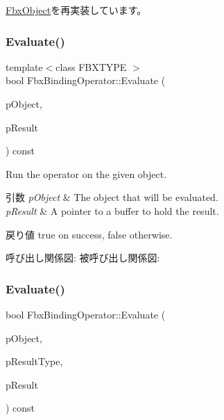 \hyperlink{class_fbx_object_a123e084d9b32b29c28af6384b7c3c608}{Fbx\+Object}を再実装しています。

\mbox{\label{class_fbx_binding_operator_a1487485be07b04ef755f8831912d2709}} 
\subsubsection{\texorpdfstring{Evaluate()}{Evaluate()}\hspace{0.1cm}{\footnotesize\ttfamily [1/2]}}
{\footnotesize\ttfamily template$<$class F\+B\+X\+T\+Y\+PE $>$ \\
bool Fbx\+Binding\+Operator\+::\+Evaluate (\begin{DoxyParamCaption}\item[{const \hyperlink{class_fbx_object}{Fbx\+Object} $\ast$}]{p\+Object,  }\item[{F\+B\+X\+T\+Y\+PE $\ast$}]{p\+Result }\end{DoxyParamCaption}) const}

Run the operator on the given object. 
\begin{DoxyParams}{引数}
{\em p\+Object} & The object that will be evaluated. \\
\hline
{\em p\+Result} & A pointer to a buffer to hold the result. \\
\hline
\end{DoxyParams}
\begin{DoxyReturn}{戻り値}
{\ttfamily true} on success, {\ttfamily false} otherwise. 
\end{DoxyReturn}
呼び出し関係図\+:
被呼び出し関係図\+:
\mbox{\label{class_fbx_binding_operator_a46e67c6d662013ae83cd239648d85630}} 
\subsubsection{\texorpdfstring{Evaluate()}{Evaluate()}\hspace{0.1cm}{\footnotesize\ttfamily [2/2]}}
{\footnotesize\ttfamily bool Fbx\+Binding\+Operator\+::\+Evaluate (\begin{DoxyParamCaption}\item[{const \hyperlink{class_fbx_object}{Fbx\+Object} $\ast$}]{p\+Object,  }\item[{\hyperlink{fbxpropertytypes_8h_a73913a5ddfb20e57c6f25e9e6784bd92}{E\+Fbx\+Type} $\ast$}]{p\+Result\+Type,  }\item[{void $\ast$$\ast$}]{p\+Result }\end{DoxyParamCaption}) const\hspace{0.3cm}{\ttfamily [protected]}}


